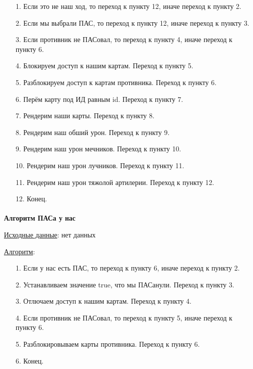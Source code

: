 \documentclass[12pt, a4paper, simple]{eskdtext}
\begin{document}
    \begin{enumerate}
        \item[1.] Если это не наш ход, то переход к пункту 12, иначе переход к пункту 2.
        \item[2.] Если мы выбрали ПАС, то переход к пункту 12, иначе переход к пункту 3.
        \item[3.] Если противник не ПАСовал, то переход к пункту 4, иначе переход к пункту 6.
        \item[4.] Блокируем доступ к нашим картам. Переход к пункту 5.
        \item[5.] Разблокируем доступ к картам противника. Переход к пункту 6.
        \item[6.] Перём карту под ИД равным id. Переход к пункту 7.
        \item[7.] Рендерим наши карты. Переход к пункту 8.
        \item[8.] Рендерим наш обший урон. Переход к пункту 9.
        \item[9.] Рендерим наш урон мечников. Переход к пункту 10.
        \item[10.] Рендерим наш урон лучников. Переход к пункту 11.
        \item[11.] Рендерим наш урон тяжолой артилерии. Переход к пункту 12.
        \item[12.] Конец.
    \end{enumerate}

    \paragraph{} \textbf{Алгоритм ПАСа у нас}

    \underline{Исходные данные}: нет данных

    \underline{Алгоритм}:

    \begin{enumerate}
        \item[1.] Если у нас есть ПАС, то переход к пункту 6, иначе переход к пункту 2.
        \item[2.] Устанавливаем значение true, что мы ПАСанули. Переход к пункту 3.
        \item[3.] Отлючаем доступ к нашим картам. Переход к пункту 4.
        \item[4.] Если противник не ПАСовал, то переход к пункту 5, иначе переход к пункту 6.
        \item[5.] Разблокировываем карты противника. Переход к пункту 6.
        \item[6.] Конец.
    \end{enumerate}
\end{document}
